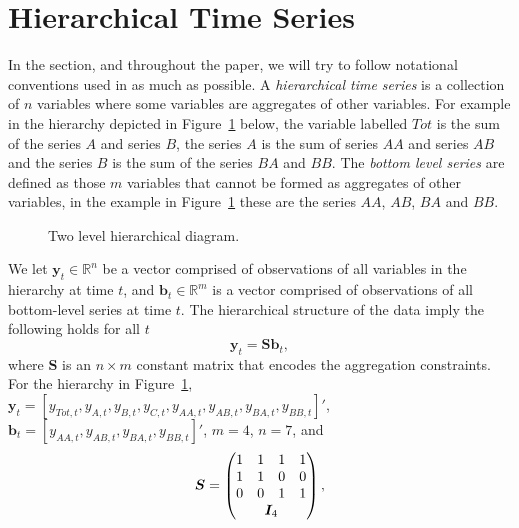 \documentclass[a4paper, 11pt]{article}
\theoremstyle{theo}
\theoremstyle{definition}
\begin{document}
\section{Hierarchical Time Series}\label{sec:notation}

In the section, and throughout the paper, we will try to follow notational conventions used in \citet{Wickramasuriya2017} as much as possible.  A {\em hierarchical time series} is a collection of $n$ variables where some variables are aggregates of other variables.  For example in the hierarchy depicted in Figure~\ref{fig1} below, the variable labelled $Tot$ is the sum of the series $A$
and series $B$, the series $A$ is the sum of series $AA$ and series $AB$ and the series $B$ is the sum of the series $BA$ and $BB$.  The {\em bottom level series} are defined as those $m$ variables that cannot be formed as aggregates of other variables, in the example in Figure~\ref{fig1} these are the series $AA$, $AB$, $BA$ and $BB$. 

\begin{figure}[H]
  \begin{center}
      
     
    \qobitree
  \end{center}
  \caption{Two level hierarchical diagram.}\label{fig1}
\end{figure}

We let $\bm{y}_t \in \mathbb{R}^n$ be a vector comprised of observations of all variables in the hierarchy at time $t$,  and $\bm{b}_t \in \mathbb{R}^m$ is a vector comprised of observations of all bottom-level series at time $t$. The hierarchical structure of the data imply the following holds for all $t$
\begin{equation}
  \bm{y}_t = \bm{Sb}_t,
\end{equation}
where $\bm{S}$ is an $n \times m$ constant matrix that encodes the aggregation constraints.  For the hierarchy in Figure~\ref{fig1}, $\bm{y}_t = [y_{Tot,t},y_{A,t}, y_{B,t},y_{C,t},y_{AA,t}, y_{AB,t}, y_{BA,t}, y_{BB,t}]'$, $\bm{b}_t = [y_{AA,t}, y_{AB,t}, y_{BA,t}, y_{BB,t}]'$, $m=4$, $n=7$, and 
$$ 
  \bm{S} = \begin{pmatrix} 
               1& 1 &1 &1  \\ 
               1 &1 & 0 &0 \\   
               0&0  & 1 & 1 \\ 
               & \multicolumn{2}{c}{\bm{I}_4} &   
           \end{pmatrix}, 
$$ 
\end{document}
